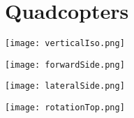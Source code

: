 \chapter{Quadcopters}


\texttt{[image: verticalIso.png]}

\texttt{[image: forwardSide.png]}

\texttt{[image: lateralSide.png]}

\texttt{[image: rotationTop.png]}



